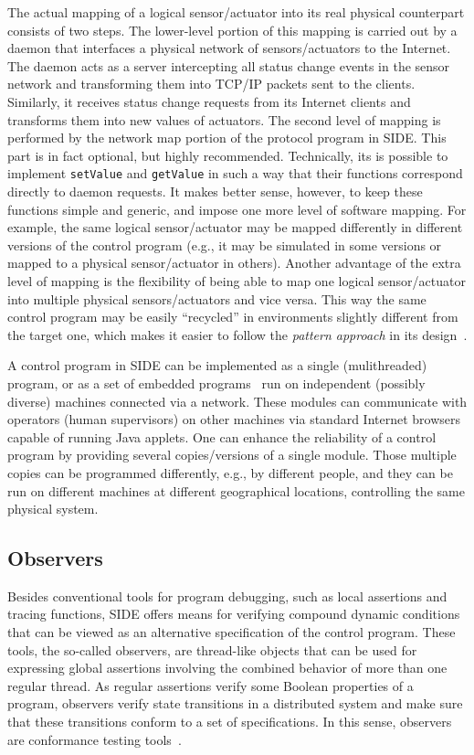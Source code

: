 The actual mapping of a logical sensor/actuator into its real physical
counterpart consists of two steps.
The lower-level portion of this mapping is carried out by a daemon that
interfaces a physical network of sensors/actuators to the Internet.
The daemon acts as a server
intercepting all status change events in the sensor network and transforming
them into TCP/IP packets sent to the clients.
Similarly, it receives status change requests from its Internet
clients and transforms them into new values of actuators.
The second level of mapping is performed by the network map portion of the
protocol program in SIDE.
This part is in fact optional, but highly recommended.
Technically, its is possible to implement {\tt setValue} and {\tt getValue}
in such a way that their functions correspond directly to daemon requests.
It makes better sense, however, to keep these functions simple and generic,
and impose one more level of software mapping.
For example, the same logical sensor/actuator may be mapped differently
in different versions of the control program (e.g., it may be simulated
in some versions or mapped to a physical sensor/actuator in others).
Another advantage of the extra level of mapping is the flexibility of
being able to map one logical sensor/actuator into multiple physical
sensors/actuators and vice versa.
This way the same control program may be easily ``recycled'' in environments
slightly different from the target one, which makes
it easier to follow the {\em pattern approach\/}
in its design~\cite{ghj94,pre95}.

A control program in SIDE can be implemented as a single (mulithreaded)
program, or as a set of embedded programs~\cite{ell97,plc97}
run on independent (possibly diverse) machines connected via a network.
These modules can communicate with operators (human supervisors)
on other machines via standard Internet browsers capable of running Java
applets.
One can enhance the reliability of a
control program by providing several copies/versions of a single module.
Those multiple copies can be programmed differently, e.g., by different people,
and they can be run on different machines at different geographical locations,
controlling the same physical system.

\subsection{Observers}

Besides conventional tools for program debugging, such as local
assertions and tracing functions, SIDE offers means for
verifying compound dynamic conditions that can be viewed as an alternative
specification of the control program.
These tools, the so-called observers,
are thread-like objects that can be used for expressing global
assertions involving the combined behavior of more than one regular thread.
As regular assertions verify some Boolean properties of a program, observers
verify state transitions in a distributed system and make sure that these
transitions conform to a set of specifications.
In this sense, observers are conformance testing
tools~\cite{aad79,gro86,mda86}.

